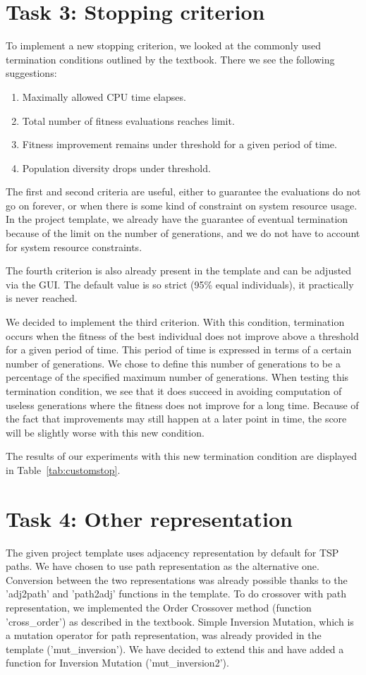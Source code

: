\documentclass{report}
\begin{document}
\section{Task 3: Stopping criterion}
\label{sec:stopping_criterion}
To implement a new stopping criterion, we looked at the commonly used termination conditions outlined by the textbook. There we see the following suggestions:
\begin{enumerate}
	\item Maximally allowed CPU time elapses.
	\item Total number of fitness evaluations reaches limit.
	\item Fitness improvement remains under threshold for a given period of time.
	\item Population diversity drops under threshold.
\end{enumerate}
The first and second criteria are useful, either to guarantee the evaluations do not go on forever, or when there is some kind of constraint on system resource usage. In the project template, we already have the guarantee of eventual termination because of the limit on the number of generations, and we do not have to account for system resource constraints.

The fourth criterion is also already present in the template and can be adjusted via the GUI. The default value is so strict (95\% equal individuals), it practically is never reached.

We decided to implement the third criterion. With this condition, termination occurs when the fitness of the best individual does not improve above a threshold for a given period of time. This period of time is expressed in terms of a certain number of generations. We chose to define this number of generations to be a percentage of the specified maximum number of generations. When testing this termination condition, we see that it does succeed in avoiding computation of useless generations where the fitness does not improve for a long time. Because of the fact that improvements may still happen at a later point in time, the score will be slightly worse with this new condition.

The results of our experiments with this new termination condition are displayed in Table~\ref{tab:customstop}.



\section{Task 4: Other representation}
The given project template uses adjacency representation by default for TSP paths. We have chosen to use path representation as the alternative one. Conversion between the two representations was already possible thanks to the 'adj2path' and 'path2adj' functions in the template. To do crossover with path representation, we implemented the Order Crossover method (function 'cross\_order') as described in the textbook. Simple Inversion Mutation, which is a mutation operator for path representation, was already provided in the template ('mut\_inversion'). We have decided to extend this and have added a function for Inversion Mutation ('mut\_inversion2').
\end{document}
